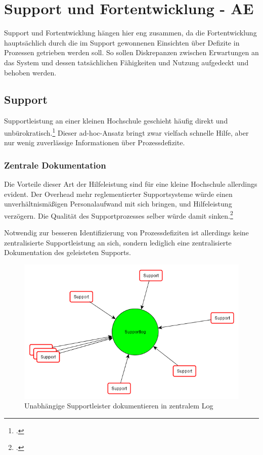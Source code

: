 \section{Support und Fortentwicklung - AE}
Support und Fortentwicklung hängen hier eng zusammen, da die Fortentwicklung 
hauptsächlich durch die im Support gewonnenen Einsichten über Defizite in Prozessen 
getrieben werden soll. So sollen Diskrepanzen zwischen Erwartungen an das System und 
dessen tatsächlichen Fähigkeiten und Nutzung aufgedeckt und behoben werden.

\subsection{Support}
Supportleistung an einer kleinen Hochschule geschieht häufig direkt und 
unbürokratisch.\footcite{gunter_muller_interview} Dieser ad-hoc-Ansatz bringt 
zwar vielfach schnelle Hilfe, aber nur wenig zuverlässige Informationen über Prozessdefizite.

\subsubsection{Zentrale Dokumentation}
Die Vorteile dieser Art der Hilfeleistung sind für eine kleine Hochschule allerdings evident. 
Der Overhead mehr reglementierter Supportsysteme würde einen unverhältnismäßigen 
Personalaufwand mit sich bringen, und Hilfeleistung verzögern. Die Qualität des 
Supportprozesses selber würde damit sinken.\footcite{gunter_muller_interview}

Notwendig zur besseren Identifizierung von Prozessdefiziten ist allerdings keine 
zentralisierte Supportleistung an sich, sondern lediglich eine zentralisierte Dokumentation 
des geleisteten Supports.

\begin{figure}[h!]
	\centering
	\includegraphics[width=\textwidth]{kapitel/gruppe3/bilder/grafik_supportlog}
	\caption{Unabhängige Supportleister dokumentieren in zentralem Log}
	\label{fig_zentraler_supportlog}
\end{figure}

